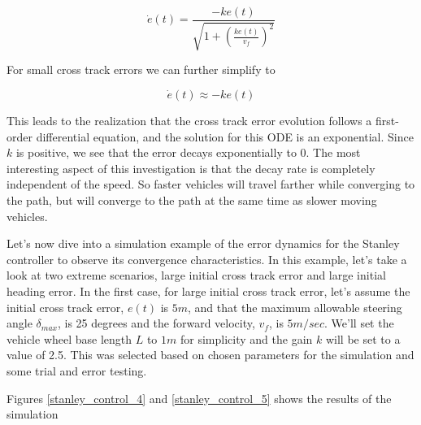 \begin{equation}
\dot{e}(t) = \frac{-ke(t)}{\sqrt{1 + (\frac{ke(t)}{v_f})^2}}
\end{equation}

For small cross track errors we can further simplify to

\begin{equation}
\dot{e}(t) \approx -ke(t)
\end{equation}

This leads to the realization that the cross track error evolution follows a first-order differential equation, and the solution for this ODE is an exponential. Since $k$ is positive, we see that the error decays exponentially to 0. The most interesting aspect of this investigation is that the decay rate is completely independent of the speed. So faster vehicles will travel farther while converging to the path, but will converge to the path at the same time as slower moving vehicles. 

Let's now dive into a simulation example of the error dynamics for the Stanley controller to observe its convergence characteristics. In this example, let's take a look at two extreme scenarios, large initial cross track error and large initial heading error. In the first case, for large initial cross track error, let's assume the initial cross track error, $e(t)$ is $5m$, and that the maximum allowable steering angle $\delta_{max}$, is 25 degrees and the forward velocity, $v_f$, is $5m/sec$. We'll set the vehicle wheel base length $L$ to $1m$ for simplicity and the gain $k$ will be set to a value of 2.5. This was selected based on chosen parameters for the simulation and some trial and error testing. 

Figures \ref{stanley_control_4} and \ref{stanley_control_5} shows the results of the simulation

